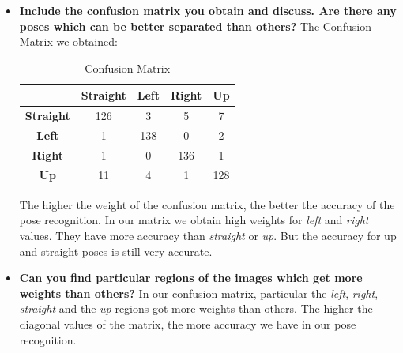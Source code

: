 \documentclass[a4paper]{article}
\begin{document}
\begin{itemize}

\item \textbf{Include the confusion matrix you obtain and discuss. Are there any poses which can be better separated than others?}
\newline \newline
The Confusion Matrix we obtained: 
\begin{table}[th]
\centering
\label{confusion_matrix_pose}
\begin{tabular}{|c|c|c|c|c|}
\hline
   & \textbf{Straight} & \textbf{Left} & \multicolumn{1}{l|}{\textbf{Right}} & \multicolumn{1}{l|}{\textbf{Up}} \\ \hline
\textbf{Straight} & 126                & 3             & 5                                   & 7                                \\ \hline
\textbf{Left}     & 1                 & 138           & 0                                   & 2                                \\ \hline
\textbf{Right}    & 1                 & 0             & 136                                 & 1                                \\ \hline
\textbf{Up}       & 11                & 4             & 1                                   & 128                              \\ \hline
\end{tabular}
\caption{Confusion Matrix}
\end{table}

\noindent
The higher the weight of the confusion matrix, the better the accuracy of the pose recognition. In our matrix we obtain high weights for \textit{left} and \textit{right} values. They have more accuracy than \textit{straight} or \textit{up}. But the accuracy for up and straight poses is still very accurate.

\item \textbf{Can you find particular regions of the images which get more weights than others?}
\newline \newline
In our confusion matrix, particular the \textit{left}, \textit{right}, \textit{straight} and the \textit{up} regions got more weights than others. The higher the diagonal values of the matrix, the more accuracy we have in our pose recognition.


\end{itemize}
\end{document}
